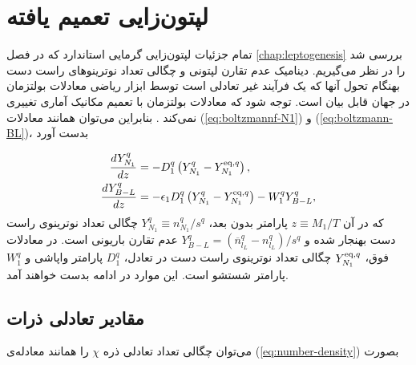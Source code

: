 \documentclass[a4paper]{book}
\begin{document}
\section{لپتون‌زایی تعمیم یافته}
\label{sec:modifeid-leptogenesis-nonextensive}
تمام جزئیات لپتون‌زایی گرمایی استاندارد که در فصل \ref{chap:leptogenesis} بررسی شد را در نظر می‌گیریم.
دینامیک عدم تقارن لپتونی و چگالی تعداد نوترینوهای راست دست بهنگام تحول آنها که یک فرآیند غیر تعادلی است توسط ابزار ریاضی معادلات بولتزمان در جهان  قابل بیان است.
توجه شود که معادلات بولتزمان با تعمیم مکانیک آماری تغییری نمی‌کند \cite{Pessah:2001mz}.
بنابراین می‌توان همانند معادلات (\ref{eq:boltzmannf-N1}) و (\ref{eq:boltzmann-BL})، بدست آورد
\par
\vspace{-0.5cm}
{\footnotesize\begin{align}
	\frac{dY^q_{N_1}}{dz} &= - D^q_1 \left( Y^q_{N_1} - Y_{N_1}^{{\rm eq}, q} \right),
	\label{eq:YN1-nonextensive}\\
	\frac{dY^q_{B-L}}{dz} &= - \epsilon_1 D^q_1 \left( Y^q_{N_1} - Y_{N_1}^{{\rm eq}, q} \right) - W^q_1 Y^q_{B-L},
	\label{eq:YBL-nonextensive}
\end{align}}
که در آن {\footnotesize$z\equiv M_1/T$} پارامتر بدون بعد، {\footnotesize$Y^q_{N_1}\equiv n^q_{N_1}/s^q$} چگالی تعداد نوترینوی راست دست بهنجار شده و {\footnotesize$Y^q_{B-L}=(\overline{n}_{l_L}^q - n^q_{l_L})/s^q$} عدم تقارن باریونی است.
در معادلات فوق، {\footnotesize$Y_{N_1}^{{\rm eq},q}$} چگالی تعداد نوترینوی راست دست در تعادل، {\footnotesize$D^q_1$} پارامتر واپاشی و {\footnotesize$W^q_1$} پارامتر شستشو است. این موارد در ادامه بدست خواهند آمد.

\subsection{مقادیر تعادلی ذرات}
\label{sec:YEq}
می‌توان چگالی تعداد تعادلی ذره {\footnotesize$\chi$} را همانند معادله‌ی (\ref{eq:number-density}) بصورت
\end{document}
